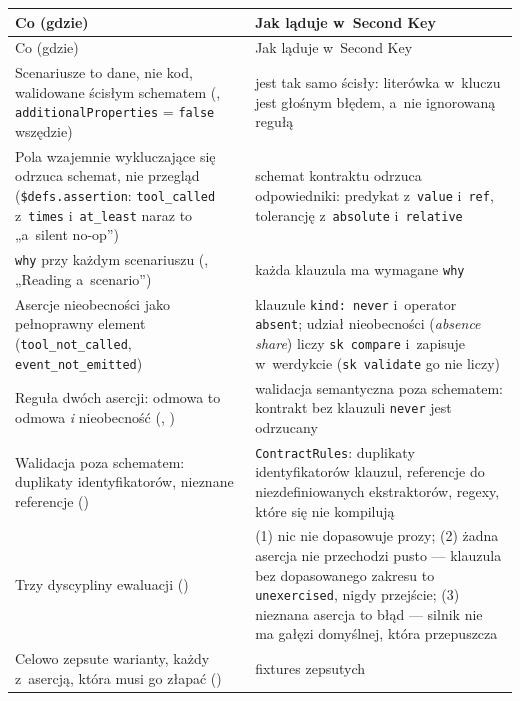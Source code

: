 {\footnotesize
\begin{xltabular}{\linewidth}{@{}>{\raggedright\arraybackslash}p{6.4cm} >{\raggedright\arraybackslash}X@{}}
\toprule
Co (gdzie) & Jak ląduje w~Second Key \\
\midrule
\endfirsthead
\toprule
Co (gdzie) & Jak ląduje w~Second Key \\
\midrule
\endhead
\bottomrule
\endlastfoot
Scenariusze to dane, nie kod, walidowane ścisłym schematem
(, \texttt{additionalProperties} = \texttt{false}
wszędzie) &  jest tak samo ścisły: literówka w~kluczu jest
głośnym błędem, a~nie ignorowaną regułą \\
Pola wzajemnie wykluczające się odrzuca schemat, nie przegląd (\texttt{\$defs.assertion}:
\texttt{tool\_called} z~\texttt{times} i~\texttt{at\_least} naraz to „a~silent no-op”) &
schemat kontraktu odrzuca odpowiedniki: predykat z~\texttt{value} i~\texttt{ref}, tolerancję z~\texttt{absolute} i~\texttt{relative} \\
\texttt{why} przy każdym scenariuszu (, „Reading a~scenario”) & każda
klauzula ma wymagane \texttt{why} \\
Asercje nieobecności jako pełnoprawny element (\texttt{tool\_not\_called},
\texttt{event\_not\_emitted}) & klauzule \texttt{kind: never} i~operator \texttt{absent};
udział nieobecności (\emph{absence share}) liczy \texttt{sk compare} i~zapisuje w~werdykcie
(\texttt{sk validate} go nie liczy) \\
Reguła dwóch asercji: odmowa to odmowa \emph{i} nieobecność (,
) & walidacja semantyczna poza schematem: kontrakt bez
klauzuli \texttt{never} jest odrzucany \\
Walidacja poza schematem: duplikaty identyfikatorów, nieznane referencje
() & \texttt{ContractRules}: duplikaty
identyfikatorów klauzul, referencje do niezdefiniowanych ekstraktorów, regexy, które się nie
kompilują \\
Trzy dyscypliny ewaluacji
() & (1) nic nie
dopasowuje prozy; (2) żadna asercja nie przechodzi pusto --- klauzula bez dopasowanego
zakresu to \texttt{unexercised}, nigdy przejście; (3) nieznana asercja to błąd --- silnik nie
ma gałęzi domyślnej, która przepuszcza \\
Celowo zepsute warianty, każdy z~asercją, która musi go złapać
() & fixtures zepsutych

\end{xltabular}}
